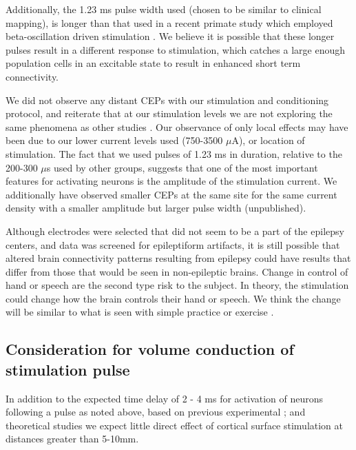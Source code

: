 Additionally, the 1.23 ms pulse width used (chosen to be similar to clinical mapping), is longer than that used in a recent primate study which employed beta-oscillation driven stimulation \cite{Zanos2018}. We believe it is possible that these longer pulses result in a different response to stimulation, which catches a large enough population cells in an excitable state to result in enhanced short term connectivity. 

We did not observe any distant CEPs with our stimulation and conditioning protocol, and reiterate that at our stimulation levels we are not exploring the same phenomena as other studies \cite{Keller2014d,Matsumoto2004b,Matsumoto2006a}. Our observance of only local effects may have been due to our lower current levels used (750-3500 $\mu$A), or location of stimulation. The fact that we used pulses of 1.23 ms in duration, relative to the 200-300 $\mu$s used by other groups, suggests that one of the most important features for activating neurons is the amplitude of the stimulation current. We additionally have observed smaller CEPs at the same site for the same current density with a smaller amplitude but larger pulse width (unpublished). 

Although electrodes were selected that did not seem to be a part of the epilepsy centers, and data was screened for epileptiform artifacts, it is still possible that altered brain connectivity patterns resulting from epilepsy could have results that differ from those that would be seen in non-epileptic brains. Change in control of hand or speech are the second type risk to the subject. In theory, the stimulation could change how the brain controls their hand or speech. We think the change will be similar to what is seen with simple practice or exercise \cite{Carel2000,Page2009}.

\subsection{Consideration for volume conduction of stimulation pulse}
In addition to the expected time delay of 2 - 4 ms for activation of neurons following a pulse as noted above, based on previous experimental \cite{Adrian1936,el1982effect,Rosenthal1967,Logothetis2010}; and theoretical studies \cite{Nathan1993,Kudela2015} we expect little direct effect of cortical surface stimulation at distances greater than 5-10mm. 

